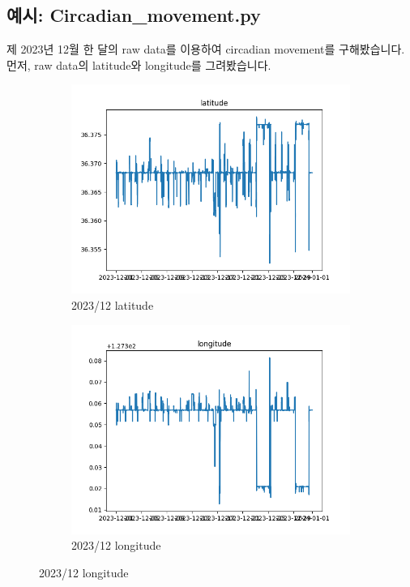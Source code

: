 \documentclass{oblivoir}
\begin{document}
  \subsection{예시: Circadian\_movement.py}
  제 2023년 12월 한 달의 raw data를 이용하여 circadian movement를 구해봤습니다.
  먼저, raw data의 latitude와 longitude를 그려봤습니다.
  \begin{figure}[H]
    \begin{subfigure}[b]{.5\textwidth}
      \centering
      \caption{2023/12 latitude}
      \includegraphics[width=\textwidth]{GPS_feature_6.png}
    \end{subfigure}%
    \begin{subfigure}[b]{.5\textwidth}
      \centering
      \caption{2023/12 longitude}
      \includegraphics[width=\textwidth]{GPS_feature_7.png}
    \end{subfigure}
  \end{figure}
\end{document}
